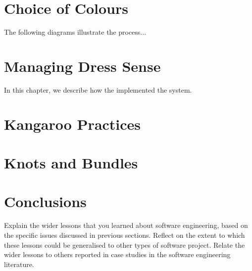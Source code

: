\documentclass{l3proj}
\begin{document}



\section{Choice of Colours}
\label{design}

The following diagrams illustrate the
process...

\section{Managing Dress Sense}
\label{managing}

In this chapter, we describe how the implemented the system.

\section{Kangaroo Practices}



\section{Knots and Bundles}
\label{sec:managing}


\section{Conclusions}

Explain the wider lessons that you learned about software engineering,
based on the specific issues discussed in previous sections.  Reflect
on the extent to which these lessons could be generalised to other
types of software project.  Relate the wider lessons to others
reported in case studies in the software engineering literature.



\end{document}
